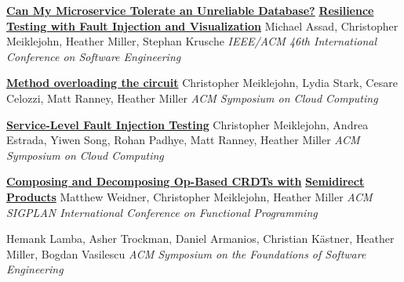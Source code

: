 \documentclass[9pt]{article}
\begin{document}
\noindent\href{https://dl.acm.org/doi/10.1145/3639478.3640021}{\bf Can My Microservice Tolerate an Unreliable Database?}\vspace{-0.03in}
\newline\noindent\href{https://dl.acm.org/doi/10.1145/3639478.3640021}{\bf Resilience Testing with Fault Injection and Visualization}
\newline\noindent Michael Assad, Christopher Meiklejohn, Heather Miller, Stephan Krusche
\newline\noindent\emph{IEEE/ACM 46th International Conference on Software Engineering}
\bigskip

\noindent\href{https://dl.acm.org/doi/10.1145/3542929.3563466}{\bf Method overloading the circuit}
\newline\noindent Christopher Meiklejohn, Lydia Stark, Cesare Celozzi, Matt Ranney, Heather Miller
\newline\noindent\emph{ACM Symposium on Cloud Computing}
\bigskip

\noindent\href{https://dl.acm.org/doi/10.1145/3472883.3487005}{\bf Service-Level Fault Injection Testing}
\newline\noindent Christopher Meiklejohn, Andrea Estrada, Yiwen Song, Rohan Padhye, \vspace{-0.03in}
\newline\noindent Matt Ranney, Heather Miller
\newline\noindent\emph{ACM Symposium on Cloud Computing}
\bigskip

\noindent\href{https://arxiv.org/abs/2004.04303}{\bf Composing and Decomposing Op-Based CRDTs with}\vspace{-0.03in}
\newline\noindent\href{https://arxiv.org/abs/2004.04303}{\bf Semidirect Products}
\newline\noindent Matthew Weidner, Christopher Meiklejohn, Heather Miller
\newline\noindent\emph{ACM SIGPLAN International Conference on Functional Programming}
\bigskip

\vspace{-0.03in}
\newline{}
\newline\noindent Hemank Lamba, Asher Trockman, Daniel Armanios, Christian K\"{a}stner, \vspace{-0.03in}
\newline\noindent Heather Miller, Bogdan Vasilescu
\newline\noindent\emph{ACM Symposium on the Foundations of Software Engineering}
\bigskip
\end{document}
